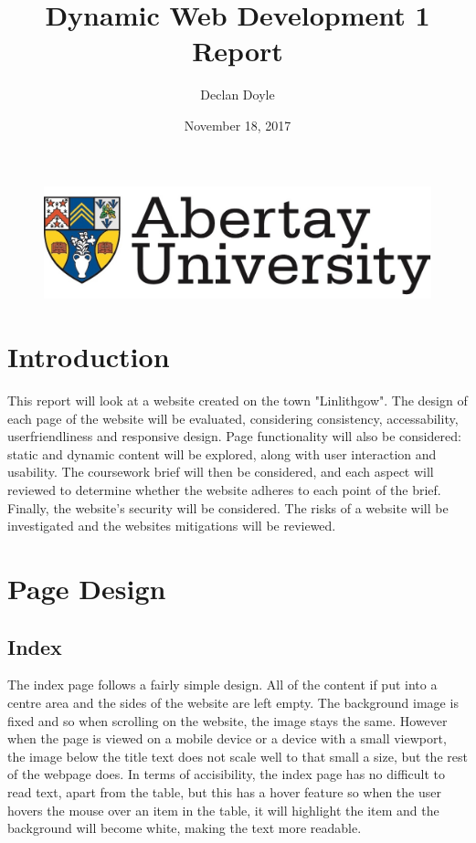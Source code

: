 \documentclass[12pt,a4paper]{article}
\title{Dynamic Web Development 1 Report}
\author{Declan Doyle}
\affil{BSc Ethical Hacking\\
		Abertay University\\
		Dundee, United Kingdom\\
		1600219@abertay.ac.uk}
\date{November 18, 2017}
\begin{document}

	\begin{figure}
		\includegraphics[width=\linewidth]{img/Unilogo}
	\end{figure}


	\maketitle

	\page


	\newpage
	\tableofcontents
	\newpage



	\section{Introduction}
		This report will look at a website created on the town "Linlithgow". The design of each page of the website will be evaluated, considering consistency, accessability, userfriendliness and responsive design.
		Page functionality will also be considered: static and dynamic content will be explored, along with user interaction and usability.
		The coursework brief will then be considered, and each aspect will reviewed to determine whether the website adheres to each point of the brief.
		Finally, the website's security will be considered. The risks of a website will be investigated and the websites mitigations will be reviewed.

	\clearpage
	\section{Page Design}
		\subsection{Index}
		The index page follows a fairly simple design. All of the content if put into a centre area and the sides of the website are left empty. The background image is fixed and so when scrolling on the website, the image stays the same. However when the page is viewed on a mobile device or a device with a small viewport, the image below the title text does not scale well to that small a size, but the rest of the webpage does. In terms of accisibility, the index page has no difficult to read text, apart from the table, but this has a hover feature so when the user hovers the mouse over an item in the table, it will highlight the item and the background will become white, making the text more readable.
\end{document}
